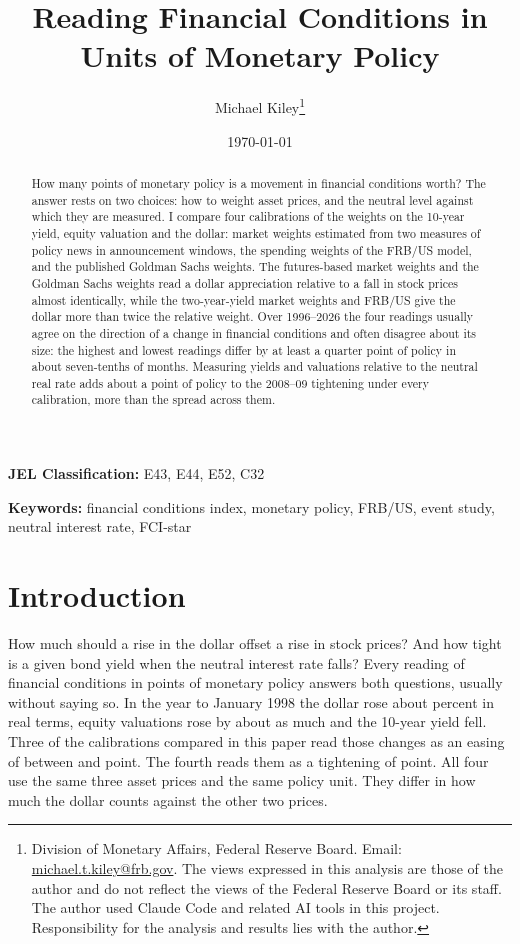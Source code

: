 \documentclass[11pt]{article}
\title{Reading Financial Conditions in Units of Monetary Policy}
\author{Michael Kiley\thanks{Division of Monetary Affairs, Federal Reserve Board. Email: \href{mailto:michael.t.kiley@frb.gov}{michael.t.kiley@frb.gov}. The views expressed in this analysis are those of the author and do not reflect the views of the Federal Reserve Board or its staff. The author used Claude Code and related AI tools in this project. Responsibility for the analysis and results lies with the author.}}
\date{\today}
\begin{document}
\maketitle

\begin{abstract}
How many points of monetary policy is a movement in financial conditions worth? The answer rests on two choices: how to weight asset prices, and the neutral level against which they are measured. I compare four calibrations of the weights on the 10-year yield, equity valuation and the dollar: market weights estimated from two measures of policy news in announcement windows, the spending weights of the FRB/US model, and the published Goldman Sachs weights. The futures-based market weights and the Goldman Sachs weights read a dollar appreciation relative to a fall in stock prices almost identically, while the two-year-yield market weights and FRB/US give the dollar more than twice the relative weight. Over 1996--2026 the four readings usually agree on the direction of a change in financial conditions and often disagree about its size: the highest and lowest readings differ by at least a quarter point of policy in about seven-tenths of months. Measuring yields and valuations relative to the neutral real rate adds about a point of policy to the 2008--09 tightening under every calibration, more than the spread across them.
\end{abstract}

\noindent\textbf{JEL Classification:} E43, E44, E52, C32

\noindent\textbf{Keywords:} financial conditions index, monetary policy, FRB/US, event study, neutral interest rate, FCI-star

\pagestyle{plain}

\newpage
{}

\section{Introduction}
How much should a rise in the dollar offset a rise in stock prices? And how tight is a given bond yield when the neutral interest rate falls? Every reading of financial conditions in points of monetary policy answers both questions, usually without saying so. In the year to January 1998 the dollar rose about  percent in real terms, equity valuations rose by about as much and the 10-year yield fell. Three of the calibrations compared in this paper read those changes as an easing of between  and  point. The fourth reads them as a tightening of  point. All four use the same three asset prices and the same policy unit. They differ in how much the dollar counts against the other two prices.
\end{document}
